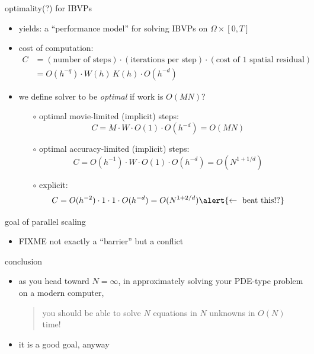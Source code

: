 \documentclass[hide notes,intlimits,usenames,dvipsnames]{beamer}
\begin{document}
\begin{frame}{optimality(?) for IBVPs}

\begin{itemize}
\item yields: a ``performance model'' for solving IBVPs on $\Omega \times [0,T]$
\item cost of computation:
\footnotesize
\begin{align*}
C &= (\text{number of steps}) \cdot (\text{iterations per step}) \cdot (\text{cost of 1 spatial residual}) \\
  &= O(h^{-q}) \cdot W(h) \, K(h) \cdot O(h^{-d})
\end{align*}
\normalsize
\item we define solver to be \emph{optimal} if work is $O(MN)$?
    \begin{itemize}
    \item[$\circ$] optimal movie-limited (implicit) steps:
        $$C = M \cdot W \cdot O(1) \cdot O(h^{-d}) = O(MN)$$
    \item[$\circ$] optimal accuracy-limited (implicit) steps:
        $$C = O(h^{-1}) \cdot W \cdot O(1) \cdot O(h^{-d}) = O(N^{1+1/d})$$
    \item[$\circ$] explicit:
        $$C = O(h^{-2}) \cdot 1 \cdot 1 \cdot O(h^{-d}) = O(N^{1+2/d}) \hfill \alert{\leftarrow \text{ beat this!?}}$$
    \end{itemize}
\end{itemize}
\end{frame}


\begin{frame}{goal of parallel scaling}
\begin{itemize}
\item FIXME not exactly a ``barrier'' but a conflict
\end{itemize}
\end{frame}


\begin{frame}{conclusion}
\begin{itemize}
\item as you head toward $N=\infty$, in approximately solving your PDE-type problem on a modern computer,

\bigskip
\begin{quote}
\alert{you should be able to solve $N$ equations in $N$ unknowns in $O(N)$ time!}
\end{quote}

\bigskip
\item it is a good goal, anyway
\end{itemize}
\end{frame}
\end{document}
